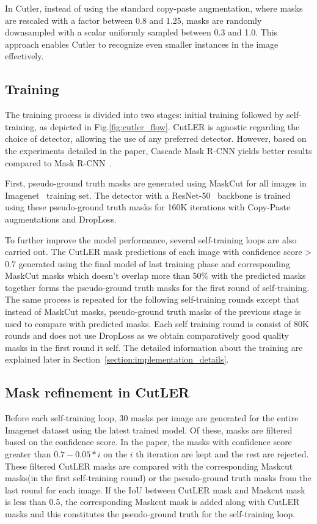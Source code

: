 In Cutler, instead of using the standard copy-paste augmentation, where masks are rescaled with a factor between 0.8 and 1.25, masks are randomly downsampled with a scalar uniformly sampled between 0.3 and 1.0. This approach enables Cutler to recognize even smaller instances in the image effectively.

\subsection{Training}
The training process is divided into two stages: initial training followed by self-training, as depicted in Fig.\ref{fig:cutler_flow}. CutLER is agnostic regarding the choice of detector, allowing the use of any preferred detector. However, based on the experiments detailed in the paper, Cascade Mask R-CNN\cite{cai2019cascadercnnhighquality} yields better results compared to Mask R-CNN~\cite{he2018maskrcnn}.

First, pseudo-ground truth masks are generated using MaskCut for all images in Imagenet~\cite{deng2009imagenet} training set. The detector with a ResNet-50~\cite{he2015deepresiduallearningimage} backbone is trained using these pseudo-ground truth masks for 160K iterations with Copy-Paste augmentations and DropLoss.

To further improve the model performance, several self-training loops are also carried out. The CutLER mask predictions of each image with confidence score > 0.7 generated using the final model of last training phase and corresponding MaskCut masks which doesn't overlap more than 50\% with the predicted masks together forms the pseudo-ground truth masks for the first round of self-training. The same process is repeated for the following self-training rounds except that instead of MaskCut masks, pseudo-ground truth masks of the previous stage is used to compare with predicted masks. Each self training round is consist of 80K rounds and does not use DropLoss as we obtain comparatively good quality masks in the first round it self. The detailed information about the training are explained later in Section~\ref{section:implementation_details}.

\subsection{Mask refinement in CutLER}
Before each self-training loop, 30 masks per image are generated for the entire Imagenet dataset using the latest trained model. Of these, masks are filtered based on the confidence score. In the paper, the masks with confidence score greater than \(0.7 - 0.05 * i\) on the \(i\) th iteration are kept and the rest are rejected. These filtered CutLER masks are compared with the corresponding Maskcut masks(in the first self-training round) or the pseudo-ground truth masks from the last round for each image. If the IoU between CutLER mask and Maskcut mask is less than 0.5, the corresponding Maskcut mask is added along with CutLER masks and this constitutes the pseudo-ground truth for the self-training loop.

